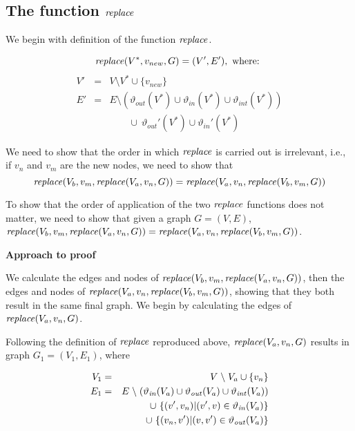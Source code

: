 \subsection{The function $\mathit{replace}$}


We begin with definition of the function $\mathit{replace}$.
\vspace*{10pt}
\begin{definition}[replace]
\label{def:group-replace}

\[ \mathit{replace} (V^*, v_{new}, G) = (V', E'), \mbox{ where: } \]
\begin{eqnarray*}
V' & = & V  \setminus V^*  \cup \{v_{new}\}\\
E' & = & E  \setminus (\vartheta_{out}(V^*) \cup \vartheta_{in}(V^*) \cup \vartheta_{int}(V^*))  \\
   & & \qquad \cup\  \vartheta_{out}'(V^*)  \cup \vartheta_{in}'(V^*)
\end{eqnarray*}
\end{definition}


We need to show that the order in which $\mathit{replace}$ is carried out is irrelevant, i.e., if $v_n$ and $v_m$ are the new nodes, we need to show that
\[
\mathit{replace}(V_b,v_m,\mathit{replace}(V_a,v_n,G)) = \mathit{replace}(V_a,v_n,\mathit{replace}(V_b,v_m,G))
  \]
  


  

To show that  the order of application of the two $\mathit{replace}$ functions does not matter,   we need to show that given a graph $G=(V,E)$,    $\mathit{replace}(V_b,v_m,\mathit{replace}(V_a,v_n,G)) = \mathit{replace}(V_a,v_n,\mathit{replace}(V_b,v_m,G))$.
  
\vspace{10pt}
{\bf Approach to proof}
\vspace{10pt}

We  calculate the edges and nodes of
$\mathit{replace}(V_b,v_m,\mathit{replace}(V_a,v_n,G))$, then the edges and nodes of
$\mathit{replace}(V_a,v_n,\mathit{replace}(V_b,v_m,G))$, 
showing that they both result in the same final graph.
%
We begin by calculating the edges of $\mathit{replace}(V_a,v_n,G)$.

Following the definition of $\mathit{replace}$ reproduced above, $\mathit{replace}(V_a,v_n,G)$ results in graph $G_1=(V_1,E_1)$, where

\begin{eqnarray*}
  V_1 & = & V\mathrel{\backslash} V_a \cup \{v_n\}\\
  E_1 & = & E\mathrel{\backslash} ( \mathit{\vartheta_{in}}(V_a) \cup \mathit{\vartheta_{out}}(V_a) \cup \mathit{\vartheta_{int}}(V_a)) \\
  && \cup\ \{(v',v_{n})|(v',v) \in \mathit{\vartheta_{in}}(V_a) \}\\
  && \cup\ \{(v_{n},v')|(v,v') \in \mathit{\vartheta_{out}}(V_a) \}\\
\end{eqnarray*}

